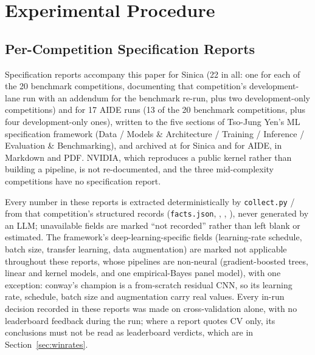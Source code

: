 \documentclass[11pt,a4paper]{article}
\begin{document}
\appendix

\section{Experimental Procedure}
\label{app:specs}

\subsection{Per-Competition Specification Reports}

Specification reports accompany this paper for Sinica (22 in all: one for each of the 20 benchmark competitions, documenting that competition's development-lane run with an addendum for the benchmark re-run, plus two development-only competitions) and for 17 AIDE runs (13 of the 20 benchmark competitions, plus four development-only ones), written to the five sections of Tso-Jung Yen's ML specification framework (Data / Models \& Architecture / Training / Inference / Evaluation \& Benchmarking), and archived at \href{https://github.com/930731haohao-afk/kaggle-agent/tree/main/docs/ml_specs}{} for Sinica and \href{https://github.com/930731haohao-afk/kaggle-agent/tree/main/benchmark_results/ml_specs_aide}{} for AIDE, in Markdown and PDF. NVIDIA, which reproduces a public kernel rather than building a pipeline, is not re-documented, and the three mid-complexity competitions have no specification report.

Every number in these reports is extracted deterministically by \texttt{collect.py} /  from that competition's structured records (\texttt{facts.json}, , , ), never generated by an LLM; unavailable fields are marked ``not recorded'' rather than left blank or estimated. The framework's deep-learning-specific fields (learning-rate schedule, batch size, transfer learning, data augmentation) are marked not applicable throughout these reports, whose pipelines are non-neural (gradient-boosted trees, linear and kernel models, and one empirical-Bayes panel model), with one exception: conway's champion is a from-scratch residual CNN, so its learning rate, schedule, batch size and augmentation carry real values. Every in-run decision recorded in these reports was made on cross-validation alone, with no leaderboard feedback during the run; where a report quotes CV only, its conclusions must not be read as leaderboard verdicts, which are in Section~\ref{sec:winrates}.
\end{document}

